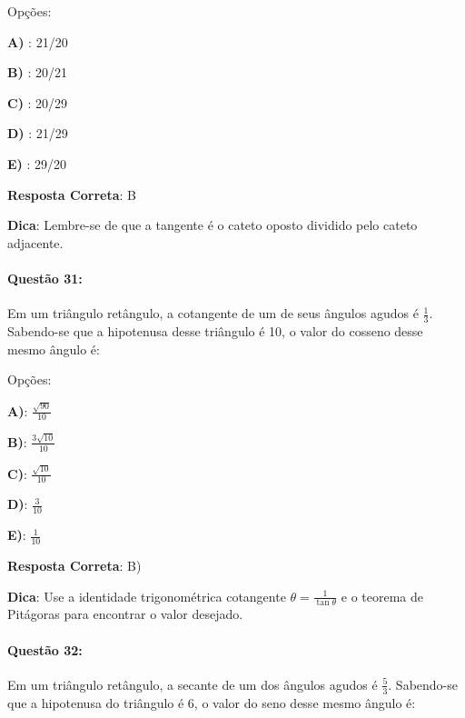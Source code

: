 \documentclass{article}
\begin{document}
\vspace{\baselineskip}Opções:

\vspace{\baselineskip}\textbf{A) }: 21/20 

\textbf{B) }: 20/21 

\textbf{C) }: 20/29 

\textbf{D) }: 21/29 

\textbf{E) }: 29/20 

\vspace{\baselineskip}\textbf{Resposta Correta}: B

\vspace{\baselineskip}\textbf{Dica}: Lembre-se de que a tangente é o cateto oposto dividido pelo cateto adjacente.

\paragraph{Questão 31:}
{Em um triângulo retângulo, a cotangente de um de seus ângulos agudos é \( \frac{1}{3} \). Sabendo-se que a hipotenusa desse triângulo é 10, o valor do cosseno desse mesmo ângulo é:}

\vspace{\baselineskip}Opções:

\vspace{\baselineskip}\textbf{A)}: \( \frac{\sqrt{90}}{10} \) 

\textbf{B)}: \( \frac{3\sqrt{10}}{10} \) 

\textbf{C)}: \( \frac{\sqrt{10}}{10} \) 

\textbf{D)}: \( \frac{3}{10} \) 

\textbf{E)}: \( \frac{1}{10} \) 

\vspace{\baselineskip}\textbf{Resposta Correta}: B)

\vspace{\baselineskip}\textbf{Dica}: Use a identidade trigonométrica cotangente \( \theta = \frac{1}{\tan \theta} \) e o teorema de Pitágoras para encontrar o valor desejado.

\paragraph{Questão 32:}
{Em um triângulo retângulo, a secante de um dos ângulos agudos é \( \frac{5}{3} \). Sabendo-se que a hipotenusa do triângulo é 6, o valor do seno desse mesmo ângulo é:}
\end{document}
